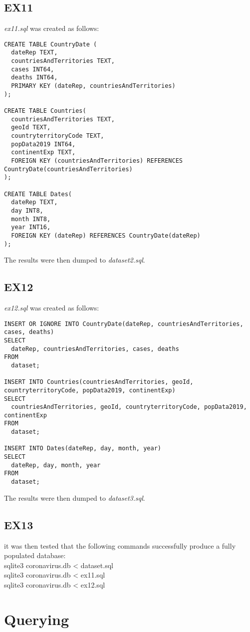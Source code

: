 \documentclass{article}
\begin{document}
\subsection{EX11}
\textit{ex11.sql} was created as follows: 
\begin{verbatim}
CREATE TABLE CountryDate (
  dateRep TEXT,
  countriesAndTerritories TEXT,
  cases INT64,
  deaths INT64,
  PRIMARY KEY (dateRep, countriesAndTerritories)
);

CREATE TABLE Countries(
  countriesAndTerritories TEXT,
  geoId TEXT,
  countryterritoryCode TEXT,
  popData2019 INT64,
  continentExp TEXT,
  FOREIGN KEY (countriesAndTerritories) REFERENCES CountryDate(countriesAndTerritories)
);

CREATE TABLE Dates(
  dateRep TEXT,
  day INT8,
  month INT8,
  year INT16,
  FOREIGN KEY (dateRep) REFERENCES CountryDate(dateRep)
);
\end{verbatim}
The results were then dumped to \textit{dataset2.sql}.

\subsection{EX12}
\textit{ex12.sql} was created as follows: 
\begin{verbatim}
INSERT OR IGNORE INTO CountryDate(dateRep, countriesAndTerritories, cases, deaths)
SELECT
  dateRep, countriesAndTerritories, cases, deaths
FROM
  dataset;

INSERT INTO Countries(countriesAndTerritories, geoId, countryterritoryCode, popData2019, continentExp)
SELECT
  countriesAndTerritories, geoId, countryterritoryCode, popData2019, continentExp
FROM
  dataset;

INSERT INTO Dates(dateRep, day, month, year)
SELECT
  dateRep, day, month, year
FROM
  dataset;
\end{verbatim}
The results were then dumped to \textit{dataset3.sql}.

\subsection{EX13}
it was then tested that the following commands successfully produce a fully populated database: \\
\indent sqlite3 coronavirus.db < dataset.sql \\
\indent sqlite3 coronavirus.db < ex11.sql \\
\indent sqlite3 coronavirus.db < ex12.sql 

\section{Querying}
\end{document}
